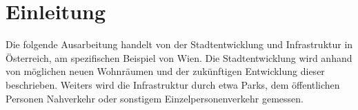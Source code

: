 \section{Einleitung}

Die folgende Ausarbeitung handelt von der Stadtentwicklung und Infrastruktur in Österreich, am spezifischen Beispiel von Wien. Die Stadtentwicklung wird anhand von möglichen neuen Wohnräumen und der zukünftigen Entwicklung dieser beschrieben. Weiters wird die Infrastruktur durch etwa Parks, dem öffentlichen Personen Nahverkehr oder sonstigem Einzelpersonenverkehr gemessen.